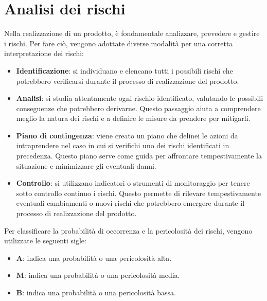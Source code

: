 \documentclass[9pt]{article}
\begin{document}
\section{Analisi dei rischi}
Nella realizzazione di un prodotto, è fondamentale analizzare, prevedere e gestire i rischi. Per fare ciò, vengono adottate diverse modalità per una corretta interpretazione dei rischi:

\begin{itemize}
	\item \textbf{Identificazione}: si individuano e elencano tutti i possibili rischi che potrebbero verificarsi durante il processo di realizzazione del prodotto.

	\item \textbf{Analisi}: si studia attentamente ogni rischio identificato, valutando le possibili conseguenze che potrebbero derivarne. Questo passaggio aiuta a comprendere meglio la natura dei rischi e a definire le misure da prendere per mitigarli.

	\item \textbf{Piano di contingenza}: viene creato un piano che delinei le azioni da intraprendere nel caso in cui si verifichi uno dei rischi identificati in precedenza. Questo piano serve come guida per affrontare tempestivamente la situazione e minimizzare gli eventuali danni.

	\item \textbf{Controllo}: si utilizzano indicatori o strumenti di monitoraggio per tenere sotto controllo continuo i rischi. Questo permette di rilevare tempestivamente eventuali cambiamenti o nuovi rischi che potrebbero emergere durante il processo di realizzazione del prodotto.
\end{itemize}
Per classificare la probabilità di occorrenza e la pericolosità dei rischi, vengono utilizzate le seguenti sigle:

\begin{itemize}
	\item \textbf{A}: indica una probabilità o una pericolosità alta.
	\item \textbf{M}: indica una probabilità o una pericolosità media.
	\item \textbf{B}: indica una probabilità o una pericolosità bassa.
\end{itemize}
\end{document}
